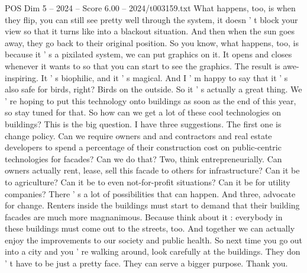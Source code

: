 \begin{textsample}{POS Dim 5 – 2024 – Score 6.00 – 2024/t003159.txt}
What happens, too, is when they flip, you can still see pretty well through the system, it doesn ' t block your view so that it turns like into a blackout situation.
And then when the sun goes away, they go back to their original position.
So you know, what happens, too, is because it ' s a pixilated system, we can put graphics on it.
It opens and closes whenever it wants to so that you can start to see the graphics.
The result is awe-inspiring.
It ' s biophilic, and it ' s magical.
And I ' m happy to say that it ' s also safe for birds, right?
Birds on the outside.
So it ' s actually a great thing.
We ' re hoping to put this technology onto buildings as soon as the end of this year, so stay tuned for that.
So how can we get a lot of these cool technologies on buildings?
This is the big question.
I have three suggestions.
The first one is change policy.
Can we require owners and and contractors and real estate developers to spend a percentage of their construction cost on public-centric technologies for facades?
Can we do that?
Two, think entrepreneurially.
Can owners actually rent, lease, sell this facade to others for infrastructure?
Can it be to agriculture?
Can it be to even not-for-profit situations?
Can it be for utility companies?
There ' s a lot of possibilities that can happen.
And three, advocate for change.
Renters inside the buildings must start to demand that their building facades are much more magnanimous.
Because think about it : everybody in these buildings must come out to the streets, too.
And together we can actually enjoy the improvements to our society and public health.
So next time you go out into a city and you ' re walking around, look carefully at the buildings.
They don ' t have to be just a pretty face.
They can serve a bigger purpose.
Thank you.

\end{textsample}
